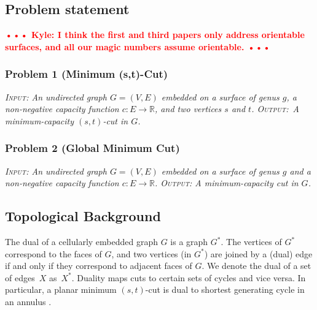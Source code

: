 \documentclass[natbib]{svcyclop}
\def\NOTE#1{\textcolor{Red}{\textbf{\textsf{••• #1 •••}}}}
\begin{document}
\subsection{Problem statement}

\NOTE{Kyle: I think the first and third papers only address orientable surfaces, and all our magic numbers assume orientable.}
\subsubsection{Problem 1 (Minimum (s,t)-Cut)}
{\itshape
\textsc{Input}: An undirected graph $G = (V, E)$ embedded on a surface of genus $g$, a non-negative capacity function $c\colon E \to \mathbb{R}$, and two vertices $s$ and $t$. \textsc{Output}:~A minimum-capacity $(s,t)$-cut in $G$.}


\subsubsection{Problem 2 (Global Minimum Cut)}
{\itshape
\textsc{Input}: An undirected graph $G = (V, E)$  embedded on a surface of genus $g$ and a non-negative capacity function $c\colon E \to \mathbb{R}$.  \textsc{Output}: A minimum-capacity cut in $G$.}




\KeyRes

\subsection{Topological Background}


The dual of a cellularly embedded graph $G$ is a graph $G^*$.  The vertices of $G^*$ correspond to the faces of $G$, and two vertices (in $G^*$) are joined by a (dual) edge if and only if they correspond to adjacent faces of $G$.
We denote the dual of a set of edges~$X$ as~$X^*$.
Duality maps cuts to certain sets of cycles and vice versa.
In particular, a planar minimum $(s,t)$-cut is dual to shortest generating cycle in an annulus \cite{is-mfpn-79, r-mstcp-83}.
\end{document}
